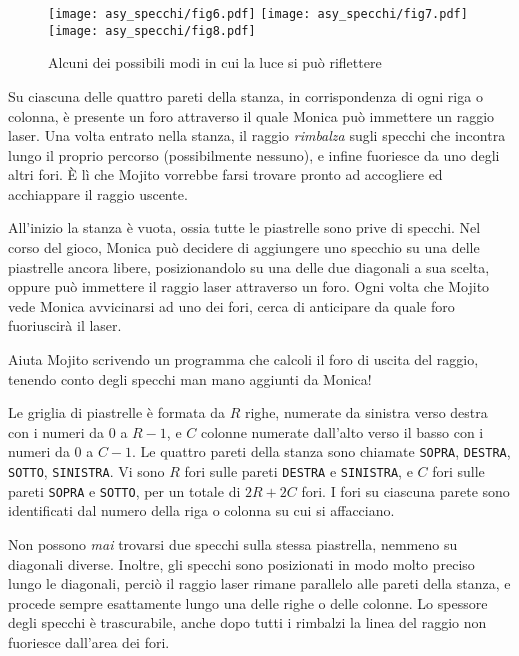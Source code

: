 \begin{figure}[H]
    \begin{center}
        \texttt{[image: asy\_specchi/fig6.pdf]}
        \texttt{[image: asy\_specchi/fig7.pdf]}
        \texttt{[image: asy\_specchi/fig8.pdf]}
    \end{center}
    \caption{Alcuni dei possibili modi in cui la luce si può riflettere}
\end{figure}

Su ciascuna delle quattro pareti della stanza, in corrispondenza di ogni riga o colonna, è presente un foro attraverso il quale Monica può immettere un raggio laser.
Una volta entrato nella stanza, il raggio \emph{rimbalza} sugli specchi che incontra lungo il proprio percorso (possibilmente nessuno),
e infine fuoriesce da uno degli altri fori.
È lì che Mojito vorrebbe farsi trovare pronto ad accogliere ed acchiappare il raggio uscente.

All'inizio la stanza è vuota, ossia tutte le piastrelle sono prive di specchi.
Nel corso del gioco, Monica può decidere di aggiungere uno specchio su una delle piastrelle ancora libere,
posizionandolo su una delle due diagonali a sua scelta,
oppure può immettere il raggio laser attraverso un foro.
Ogni volta che Mojito vede Monica avvicinarsi ad uno dei fori,
cerca di anticipare da quale foro fuoriuscirà il laser.

Aiuta Mojito scrivendo un programma che calcoli
il foro di uscita del raggio,
tenendo conto degli specchi man mano aggiunti da Monica!

\begin{mdframed}[backgroundcolor=black!10,rightline=false,leftline=false]

\Specs

\small

Le griglia di piastrelle è formata da $R$ righe, numerate da sinistra verso destra con i numeri da $0$ a $R-1$,
e $C$ colonne numerate dall'alto verso il basso con i numeri da $0$ a $C-1$.
Le quattro pareti della stanza sono chiamate
\texttt{SOPRA}, \texttt{DESTRA}, \texttt{SOTTO}, \texttt{SINISTRA}.
Vi sono $R$ fori sulle pareti \texttt{DESTRA} e \texttt{SINISTRA},
e $C$ fori sulle pareti \texttt{SOPRA} e \texttt{SOTTO},
per un totale di $2R + 2C$ fori.
I fori su ciascuna parete sono identificati dal numero della riga o colonna su cui si affacciano.

Non possono \emph{mai} trovarsi due specchi sulla stessa piastrella, nemmeno su diagonali diverse.
Inoltre, gli specchi sono posizionati in modo molto preciso lungo le diagonali,
perciò il raggio laser rimane parallelo alle pareti della stanza,
e procede sempre esattamente lungo una delle righe o delle colonne.
Lo spessore degli specchi \`e trascurabile, anche dopo tutti i rimbalzi la linea del raggio non fuoriesce dall'area dei fori.

\end{mdframed}

